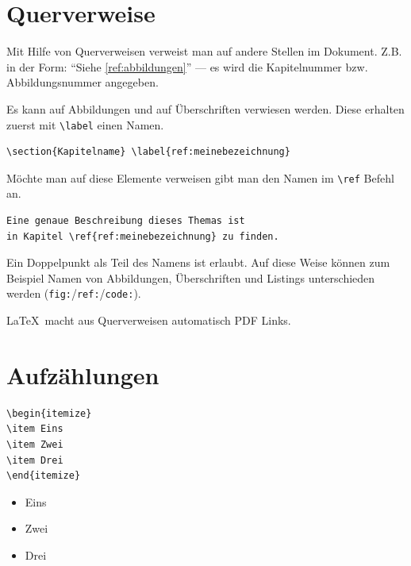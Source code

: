 \section{Querverweise}

Mit Hilfe von Querverweisen verweist man auf andere Stellen im Dokument. 
Z.B. in der Form: "`Siehe \ref{ref:abbildungen}"' --- es wird die Kapitelnummer bzw. Abbildungsnummer angegeben.

Es kann auf Abbildungen und auf Überschriften verwiesen werden.
Diese erhalten zuerst mit \lstinline{\label} einen Namen.
\begin{Verbatim}[frame=single]
\section{Kapitelname} \label{ref:meinebezeichnung}
\end{Verbatim}

Möchte man auf diese Elemente verweisen gibt man den Namen im \lstinline{\ref} Befehl an.
\begin{Verbatim}[frame=single]
Eine genaue Beschreibung dieses Themas ist 
in Kapitel \ref{ref:meinebezeichnung} zu finden.
\end{Verbatim}

Ein Doppelpunkt als Teil des Namens ist erlaubt. Auf diese Weise können zum Beispiel Namen von Abbildungen, Überschriften und Listings unterschieden werden (\mbox{\lstinline{fig:}/\lstinline{ref:}/\lstinline{code:}}).

\LaTeX\ macht aus Querverweisen automatisch PDF Links.


\section{Aufzählungen}

\begin{minipage}[c]{0.3\linewidth}
\begin{Verbatim}[frame=single]
\begin{itemize}
\item Eins
\item Zwei
\item Drei
\end{itemize}
\end{Verbatim}
\end{minipage}
\begin{minipage}[c]{0.5\linewidth}
\begin{itemize}
\item Eins
\item Zwei
\item Drei
\end{itemize}
\end{minipage}

